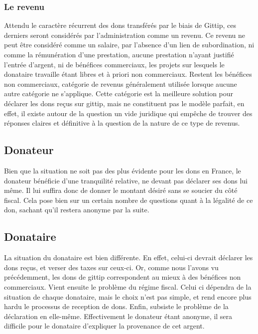             \subsubsection{Le revenu}
                Attendu le caractère récurrent des dons transférés par
                le biais de Gittip, ces derniers seront considérés par
                l'administration comme un revenu.
                Ce revenu ne peut être considéré comme un salaire, par
                l'absence d'un lien de subordination, ni comme la
                rémunération d'une prestation, aucune prestation n'ayant
                justifié l'entrée d'argent, ni de bénéfices commerciaux,
                les projets sur lesquels le donataire travaille étant libres
                et à priori non commerciaux.
                Restent les bénéfices non commerciaux, catégorie de
                revenus généralement utilisée lorsque aucune autre
                catégorie ne s'applique.
                Cette catégorie est la meilleure solution pour déclarer les
                dons reçus sur gittip, mais ne constituent pas le modèle
                parfait, en effet, il existe autour de la question un vide
                juridique qui empêche de trouver des réponses claires et 
                définitive à la question de la nature de ce type de revenus.
                
        \subsection{Donateur}
            Bien que la situation ne soit pas des plus évidente pour les dons
            en France, le donateur bénéficie d'une tranquilité relative, ne
            devant pas déclarer ses dons lui même. Il lui suffira donc de
            donner le montant désiré sans se soucier du côté fiscal. Cela
            pose bien sur un certain nombre de questions quant à la légalité
            de ce don, sachant qu'il restera anonyme par la suite.

        \subsection{Donataire}
            La situation du donataire est bien différente. En effet, celui-ci
            devrait déclarer les dons reçus, et verser des taxes sur ceux-ci.
            Or, comme nous l'avons vu précédemment, les dons de gittip
            correspondent au mieux à des bénéfices non commerciaux.
            Vient ensuite le problème du régime fiscal. Celui ci dépendra
            de la situation de chaque donataire, mais le choix n'est pas
            simple, et rend encore plus hardu le processus de reception
            de dons.
            Enfin, subsiste le problème de la déclaration en elle-même.
            Effectivement le donateur étant anonyme, il sera difficile
            pour le donataire d'expliquer la provenance de cet argent.


